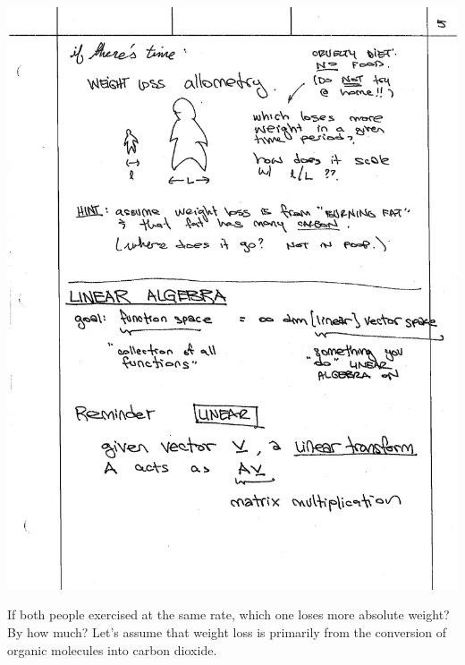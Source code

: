 \begin{center}
\includegraphics[width=.4\textwidth]{figures/lec01_allometry.pdf}
\end{center}

If both people exercised at the same rate, which one loses more absolute weight? By how much? Let’s assume that weight loss is primarily from the conversion of organic molecules into carbon dioxide. 
